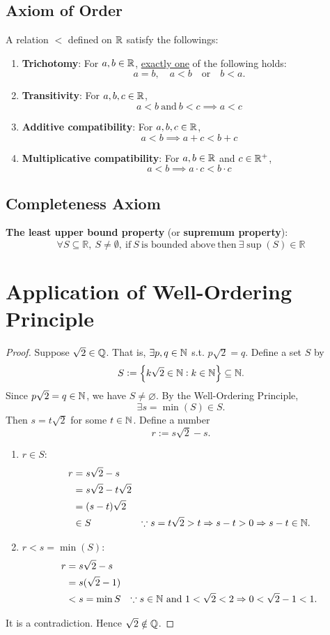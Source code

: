 \documentclass[11pt,openany]{article}
\begin{document}
\subsection{Axiom of Order}
A relation $<$ defined on $\mathbb{R}$ satisfy the followings:
\begin{enumerate}
	\item \hypertarget{trichotomy}{\textbf{Trichotomy}: 
	For $a,b\in\mathbb{R}$, \underline{exactly one} of the following holds: \[
	a=b,\quad a < b\quad \text{or}\quad b < a.
	\]}
	\item \textbf{Transitivity}: For $a,b,c\in\mathbb{R}$,
	\[a < b \ \text{and} \ b < c \implies a < c\]
	\item \textbf{Additive compatibility}: For $a,b,c\in\mathbb{R}$,
	\[a < b \implies a + c < b + c\]
	\item \textbf{Multiplicative compatibility}: For $a,b\in\mathbb{R}$ and $c\in\mathbb{R}^+$,
	\[a < b \implies a \cdot c < b \cdot c\]
\end{enumerate}
\vspace{20pt}
\subsection{Completeness Axiom}
\textbf{The least upper bound property} (or \textbf{supremum property}): 
\[
\forall S\subseteq \mathbb{R}, \ S \neq \emptyset, \ \text{if} \ S \ \text{is bounded above}\ \text{then}\ \exists \sup(S) \in \mathbb{R}
\]

\newpage
\section{Application of Well-Ordering Principle}
\begin{proof}
	Suppose $\sqrt{2}\in\mathbb{Q}$. That is, $\exists p,q\in\mathbb{N}$ s.t. $p\sqrt{2}=q$. Define a set $S$ by \[
	S:=\set{k\sqrt{2}\in\mathbb{N}:k\in\mathbb{N}}\subseteq\mathbb{N}.
	\] Since $p\sqrt{2}=q\in\mathbb{N}$, we have $S\neq\varnothing$. By the Well-Ordering Principle, \[
	\exists s=\min (S)\in S.
	\] Then $s=t\sqrt{2}$ for some $t\in\mathbb{N}$. Define a number \[
	r:=s\sqrt{2}-s.
	\] \begin{enumerate}
		\item $r\in S$: \begin{align*}
			r&=s\sqrt{2}-s\\
			&=s\sqrt{2}-t\sqrt{2}\\
			&=(s-t)\sqrt{2}\\
			&\in S &\because s=t\sqrt{2}>t\Rightarrow s-t>0\Rightarrow s-t\in\mathbb{N}.
		\end{align*}
		\item $r<s = \min(S)$: \begin{align*}
			r&=s\sqrt{2}-s\\
			&=s(\sqrt{2}-1)\\
			&<s=\min S &\because s\in\N\ \text{and}\ 1<\sqrt{2}<2\Rightarrow 0<\sqrt{2}-1<1.
		\end{align*}
	\end{enumerate}
	It is a contradiction. Hence $\sqrt{2}\notin\mathbb{Q}$.
\end{proof}
\newpage
\end{document}
